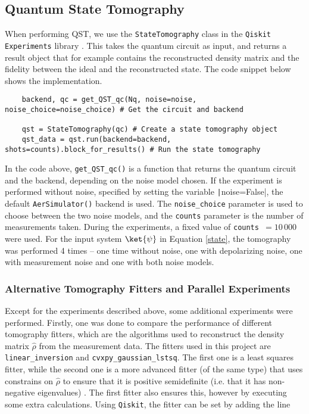 \documentclass[a4paper,12pt]{article}
\begin{document}
\subsection{Quantum State Tomography}
When performing QST, we use the \lstinline|StateTomography| class in the \texttt{Qiskit Experiments} library \cite{qiskit_exps}. This takes the quantum circuit as input, and returns a result object that for example contains the reconstructed density matrix and the fidelity between the ideal and the reconstructed state. The code snippet below shows the implementation.

\begin{tcolorbox}[title = {\footnotesize\textbf{Code Snippet, Quantum State Tomography}}, colback=black!15!white, colframe=black]
    \begin{adjustwidth}{0.25cm}{0cm}
    
    {\footnotesize 
    \begin{verbatim}
    backend, qc = get_QST_qc(Nq, noise=noise, noise_choice=noise_choice) # Get the circuit and backend

    qst = StateTomography(qc) # Create a state tomography object
    qst_data = qst.run(backend=backend, shots=counts).block_for_results() # Run the state tomography
    \end{verbatim}
    }
    \end{adjustwidth}
\end{tcolorbox}

In the code above, \lstinline|get_QST_qc()| is a function that returns the quantum circuit and the backend, depending on the noise model chosen. If the experiment is performed without noise, specified by setting the variable \texttt|noise=False|, the default \lstinline|AerSimulator()| backend is used. The \lstinline|noise_choice| parameter is used to choose between the two noise models, and the \lstinline|counts| parameter is the number of measurements taken. During the experiments, a fixed value of \lstinline|counts |$= 10\,000$ were used. For the input system $\ket{\psi}$ in Equation \ref{state}, the tomography was performed 4 times -- one time without noise, one with depolarizing noise, one with measurement noise and one with both noise models.

\subsubsection{Alternative Tomography Fitters and Parallel Experiments}
Except for the experiments described above, some additional experiments were performed. Firstly, one was done to compare the performance of different tomography fitters, which are the algorithms used to reconstruct the density matrix $\hat{\rho}$ from the measurement data. The fitters used in this project are \lstinline|linear_inversion| and \lstinline|cvxpy_gaussian_lstsq|. The first one is a least squares fitter, while the second one is a more advanced fitter (of the same type) that uses constrains on $\hat{\rho}$ to ensure that it is positive semidefinite (i.e. that it has non-negative eigenvalues) \cite{qiskit_exps}. The first fitter also ensures this, however by executing some extra calculations. Using \texttt{Qiskit}, the fitter can be set by adding the line
\end{document}
